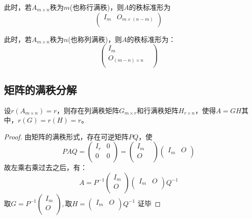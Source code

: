 此时，若$A_{m\times n}$秩为$m$(也称行满秩)，则$A$的秩标准形为$$\left(	\begin{matrix}
			I_m & O_{m\times(n-m)} \\
		\end{matrix}
	\right)
$$

此时，若$A_{m\times n}$秩为$n$(也称列满秩)，则$A$的秩标准形为：$$\left(\begin{matrix}
			I_m               & \\
			O_{(m-n)\times n} & \\
		\end{matrix}
	\right)
$$
\subsection{矩阵的满秩分解}
设$r(A_{m\times n})=r$，则存在列满秩矩阵$G_{m\times r}$和行满秩矩阵$H_{r\times n}$，使得$A=GH$其中，$r(G)=r(H)=r$。
\begin{proof}
	由矩阵的满秩形式，存在可逆矩阵$PQ$，使$$PAQ= \left (
		\begin{matrix}
				I_r & 0 \\
				0   & 0 \\
			\end{matrix}
		\right  )=\left(\begin{matrix}
				I_m & \\
				O   & \\
			\end{matrix}
		\right)
		\left(	\begin{matrix}
				I_m & O \\
			\end{matrix}
		\right)$$
	故左乘右乘过去之后，有：
	$$A= P^{-1}\left(\begin{matrix}
				I_m \\
				O   \\
			\end{matrix}
		\right)
		\left(	\begin{matrix}
				I_m & O \\
			\end{matrix}
		\right)Q^{-1}$$
	取$G= P^{-1}\left(\begin{matrix}
				I_m \\
				O   \\
			\end{matrix}
		\right),\mbox{取}H=	\left(	\begin{matrix}
				I_m & O \\
			\end{matrix}
		\right)Q^{-1}$
	证毕
\end{proof}
